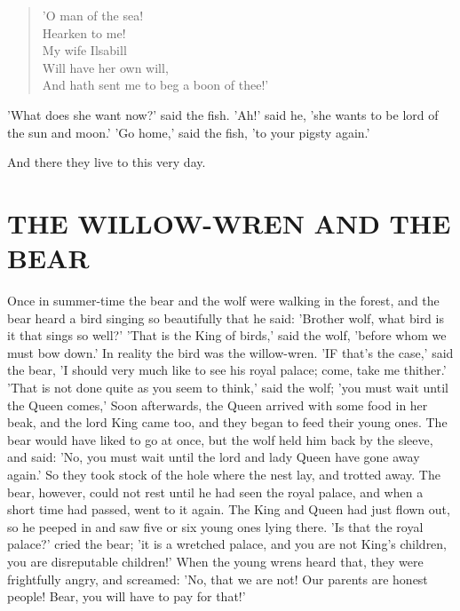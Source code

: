 \documentclass[12pt]{book}
\begin{document}
\begin{verse}
 'O man of the sea!\\
  Hearken to me!\\
  My wife Ilsabill\\
  Will have her own will,\\
  And hath sent me to beg a boon of thee!'
\end{verse}

'What does she want now?' said the fish. 'Ah!' said he, 'she wants to
be lord of the sun and moon.' 'Go home,' said the fish, 'to your
pigsty again.'

And there they live to this very day.



\chapter{THE WILLOW-WREN AND THE BEAR}

Once in summer-time the bear and the wolf were walking in the forest,
and the bear heard a bird singing so beautifully that he said:
'Brother wolf, what bird is it that sings so well?' 'That is the King
of birds,' said the wolf, 'before whom we must bow down.' In reality
the bird was the willow-wren. 'IF that's the case,' said the bear, 'I
should very much like to see his royal palace; come, take me thither.'
'That is not done quite as you seem to think,' said the wolf; 'you
must wait until the Queen comes,' Soon afterwards, the Queen arrived
with some food in her beak, and the lord King came too, and they began
to feed their young ones. The bear would have liked to go at once, but
the wolf held him back by the sleeve, and said: 'No, you must wait
until the lord and lady Queen have gone away again.' So they took
stock of the hole where the nest lay, and trotted away. The bear,
however, could not rest until he had seen the royal palace, and when a
short time had passed, went to it again. The King and Queen had just
flown out, so he peeped in and saw five or six young ones lying there.
'Is that the royal palace?' cried the bear; 'it is a wretched palace,
and you are not King's children, you are disreputable children!' When
the young wrens heard that, they were frightfully angry, and screamed:
'No, that we are not! Our parents are honest people! Bear, you will
have to pay for that!'
\end{document}
